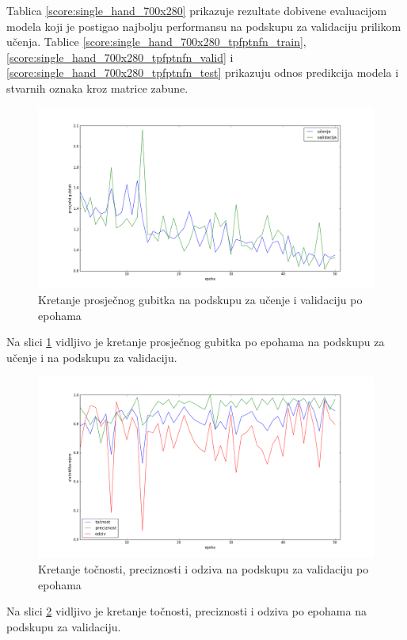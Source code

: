 \documentclass[times, utf8, diplomski, numeric]{fer}
\begin{document}
\noindent Tablica \ref{score:single_hand_700x280} prikazuje rezultate dobivene evaluacijom modela koji je postigao najbolju performansu na podskupu za validaciju prilikom učenja.
Tablice \ref{score:single_hand_700x280_tpfptnfn_train}, \ref{score:single_hand_700x280_tpfptnfn_valid} i \ref{score:single_hand_700x280_tpfptnfn_test} prikazuju odnos predikcija modela i stvarnih oznaka kroz matrice zabune.

\begin{figure}[H]
\centering
\includegraphics[scale=0.35]{images/single_hand_scale1_loss.png}
\caption{Kretanje prosječnog gubitka na podskupu za učenje i validaciju po epohama}
\label{img:single_hand_scale1_loss}
\end{figure}
\noindent Na slici \ref{img:single_hand_scale1_loss} vidljivo je kretanje prosječnog gubitka po epohama na podskupu za učenje i na podskupu za validaciju.

\begin{figure}[H]
\centering
\includegraphics[scale=0.35]{images/single_hand_scale1_acc_ap.png}
\caption{Kretanje točnosti, preciznosti i odziva na podskupu za validaciju po epohama}
\label{img:single_hand_scale1_acc_ap}
\end{figure}
\noindent Na slici \ref{img:single_hand_scale1_acc_ap} vidljivo je kretanje točnosti, preciznosti i odziva po epohama na podskupu za validaciju.
\end{document}
